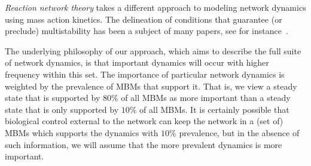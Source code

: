 \documentclass[10pt,letterpaper]{article}
\begin{document}
\textit{Reaction network theory} takes a different approach to modeling network dynamics using mass action kinetics. The delineation of conditions that guarantee (or preclude) multistability has been a subject of many papers, see for instance~\cite{dickenstein_multistationarity_2019,conradi_identifying_2017,sadeghimanesh_polynomial_2022}.

The underlying philosophy of our approach, which aims to describe the full suite of network dynamics, is that important dynamics will occur with higher frequency within this set. The importance of particular network dynamics is weighted by the prevalence of MBMs that support it. 
 That is, we view a steady state that is supported by $80\%$ of all MBMs as more important than a steady state that is only supported by $10\%$ of all MBMs. 
It is certainly possible that biological control external to the network can keep the network in a (set of) MBMs which supports the dynamics with $10\%$ prevalence, but in the absence of such information, we will assume that the more prevalent dynamics is more important.
\end{document}
